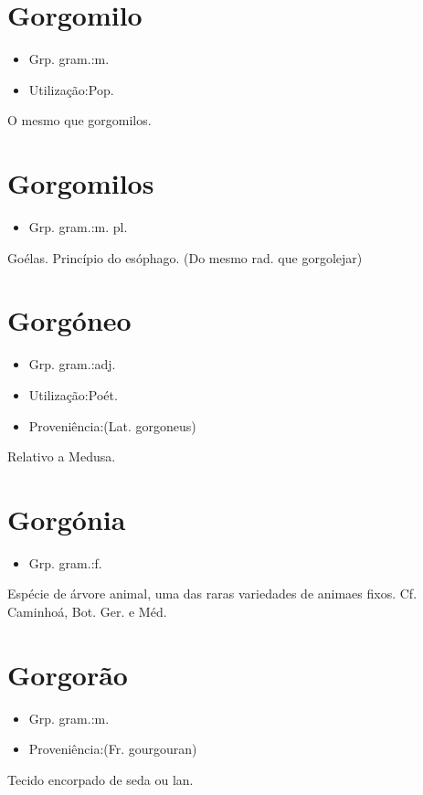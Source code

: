 \section{Gorgomilo}
\begin{itemize}
\item {Grp. gram.:m.}
\end{itemize}
\begin{itemize}
\item {Utilização:Pop.}
\end{itemize}
O mesmo que \textunderscore gorgomilos\textunderscore .
\section{Gorgomilos}
\begin{itemize}
\item {Grp. gram.:m. pl.}
\end{itemize}
Goélas.
Princípio do esóphago.
(Do mesmo rad. que \textunderscore gorgolejar\textunderscore )
\section{Gorgóneo}
\begin{itemize}
\item {Grp. gram.:adj.}
\end{itemize}
\begin{itemize}
\item {Utilização:Poét.}
\end{itemize}
\begin{itemize}
\item {Proveniência:(Lat. \textunderscore gorgoneus\textunderscore )}
\end{itemize}
Relativo a Medusa.
\section{Gorgónia}
\begin{itemize}
\item {Grp. gram.:f.}
\end{itemize}
Espécie de árvore animal, uma das raras variedades de animaes fixos. Cf. Caminhoá, \textunderscore Bot. Ger. e Méd.\textunderscore 
\section{Gorgorão}
\begin{itemize}
\item {Grp. gram.:m.}
\end{itemize}
\begin{itemize}
\item {Proveniência:(Fr. \textunderscore gourgouran\textunderscore )}
\end{itemize}
Tecido encorpado de seda ou lan.
